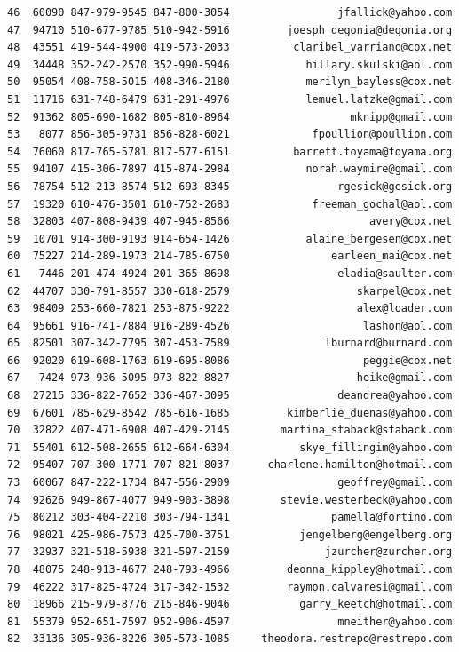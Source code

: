 \documentclass[
  12pt,
]{article}
\begin{document}
\begin{verbatim}
46  60090 847-979-9545 847-800-3054                 jfallick@yahoo.com
47  94710 510-677-9785 510-942-5916         joesph_degonia@degonia.org
48  43551 419-544-4900 419-573-2033          claribel_varriano@cox.net
49  34448 352-242-2570 352-990-5946            hillary.skulski@aol.com
50  95054 408-758-5015 408-346-2180            merilyn_bayless@cox.net
51  11716 631-748-6479 631-291-4976            lemuel.latzke@gmail.com
52  91362 805-690-1682 805-810-8964                   mknipp@gmail.com
53   8077 856-305-9731 856-828-6021             fpoullion@poullion.com
54  76060 817-765-5781 817-577-6151          barrett.toyama@toyama.org
55  94107 415-306-7897 415-874-2984            norah.waymire@gmail.com
56  78754 512-213-8574 512-693-8345                 rgesick@gesick.org
57  19320 610-476-3501 610-752-2683             freeman_gochal@aol.com
58  32803 407-808-9439 407-945-8566                      avery@cox.net
59  10701 914-300-9193 914-654-1426            alaine_bergesen@cox.net
60  75227 214-289-1973 214-785-6750                earleen_mai@cox.net
61   7446 201-474-4924 201-365-8698                 eladia@saulter.com
62  44707 330-791-8557 330-618-2579                    skarpel@cox.net
63  98409 253-660-7821 253-875-9222                    alex@loader.com
64  95661 916-741-7884 916-289-4526                     lashon@aol.com
65  82501 307-342-7795 307-453-7589               lburnard@burnard.com
66  92020 619-608-1763 619-695-8086                     peggie@cox.net
67   7424 973-936-5095 973-822-8827                    heike@gmail.com
68  27215 336-822-7652 336-467-3095                 deandrea@yahoo.com
69  67601 785-629-8542 785-616-1685         kimberlie_duenas@yahoo.com
70  32822 407-471-6908 407-429-2145        martina_staback@staback.com
71  55401 612-508-2655 612-664-6304           skye_fillingim@yahoo.com
72  95407 707-300-1771 707-821-8037      charlene.hamilton@hotmail.com
73  60067 847-222-1734 847-556-2909                 geoffrey@gmail.com
74  92626 949-867-4077 949-903-3898        stevie.westerbeck@yahoo.com
75  80212 303-404-2210 303-794-1341                pamella@fortino.com
76  98021 425-986-7573 425-700-3751           jengelberg@engelberg.org
77  32937 321-518-5938 321-597-2159               jzurcher@zurcher.org
78  48075 248-913-4677 248-793-4966         deonna_kippley@hotmail.com
79  46222 317-825-4724 317-342-1532         raymon.calvaresi@gmail.com
80  18966 215-979-8776 215-846-9046           garry_keetch@hotmail.com
81  55379 952-651-7597 952-906-4597                 mneither@yahoo.com
82  33136 305-936-8226 305-573-1085     theodora.restrepo@restrepo.com

\end{verbatim}
\end{document}
